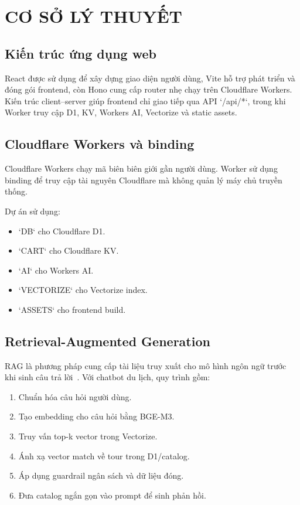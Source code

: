 \chapter{CƠ SỞ LÝ THUYẾT}

\section{Kiến trúc ứng dụng web}
React được sử dụng để xây dựng giao diện người dùng, Vite hỗ trợ phát triển và đóng gói frontend, còn Hono cung cấp router nhẹ chạy trên Cloudflare Workers. Kiến trúc client--server giúp frontend chỉ giao tiếp qua API `/api/*`, trong khi Worker truy cập D1, KV, Workers AI, Vectorize và static assets.

\section{Cloudflare Workers và binding}
Cloudflare Workers chạy mã biên biên giới gần người dùng. Worker sử dụng binding để truy cập tài nguyên Cloudflare mà không quản lý máy chủ truyền thống.

Dự án sử dụng:
\begin{itemize}
    \item `DB` cho Cloudflare D1.
    \item `CART` cho Cloudflare KV.
    \item `AI` cho Workers AI.
    \item `VECTORIZE` cho Vectorize index.
    \item `ASSETS` cho frontend build.
\end{itemize}

\section{Retrieval-Augmented Generation}
RAG là phương pháp cung cấp tài liệu truy xuất cho mô hình ngôn ngữ trước khi sinh câu trả lời~\cite{lewis2020rag}. Với chatbot du lịch, quy trình gồm:

\begin{enumerate}
    \item Chuẩn hóa câu hỏi người dùng.
    \item Tạo embedding cho câu hỏi bằng BGE-M3.
    \item Truy vấn top-k vector trong Vectorize.
    \item Ánh xạ vector match về tour trong D1/catalog.
    \item Áp dụng guardrail ngân sách và dữ liệu đóng.
    \item Đưa catalog ngắn gọn vào prompt để sinh phản hồi.
\end{enumerate}

